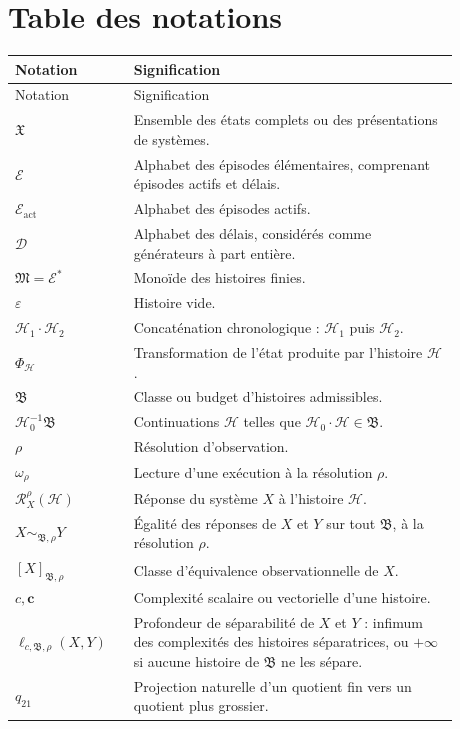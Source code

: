\section{Table des notations}
\label{annexe-histoires-notations}

\begin{center}
\begin{longtable}{p{0.23\linewidth}p{0.65\linewidth}}
\toprule
Notation & Signification \\
\midrule
\endfirsthead
\toprule
Notation & Signification \\
\midrule
\endhead
\(\mathfrak X\)
& Ensemble des états complets ou des présentations de systèmes. \\
\addlinespace
\(\mathcal E\)
& Alphabet des épisodes élémentaires, comprenant épisodes actifs et délais. \\
\addlinespace
\(\mathcal E_{\mathrm{act}}\)
& Alphabet des épisodes actifs. \\
\addlinespace
\(\mathcal D\)
& Alphabet des délais, considérés comme générateurs à part entière. \\
\addlinespace
\(\mathfrak M=\mathcal E^\ast\)
& Monoïde des histoires finies. \\
\addlinespace
\(\varepsilon\)
& Histoire vide. \\
\addlinespace
\(\mathcal H_1\cdot\mathcal H_2\)
& Concaténation chronologique : \(\mathcal H_1\) puis
  \(\mathcal H_2\). \\
\addlinespace
\(\Phi_{\mathcal H}\)
& Transformation de l'état produite par l'histoire \(\mathcal H\). \\
\addlinespace
\(\mathfrak B\)
& Classe ou budget d'histoires admissibles. \\
\addlinespace
\(\mathcal H_0^{-1}\mathfrak B\)
& Continuations \(\mathcal H\) telles que
  \(\mathcal H_0\cdot\mathcal H\in\mathfrak B\). \\
\addlinespace
\(\rho\)
& Résolution d'observation. \\
\addlinespace
\(\omega_\rho\)
& Lecture d'une exécution à la résolution \(\rho\). \\
\addlinespace
\(\mathcal R_X^\rho(\mathcal H)\)
& Réponse du système \(X\) à l'histoire \(\mathcal H\). \\
\addlinespace
\(X\sim_{\mathfrak B,\rho}Y\)
& Égalité des réponses de \(X\) et \(Y\) sur tout
  \(\mathfrak B\), à la résolution \(\rho\). \\
\addlinespace
\([X]_{\mathfrak B,\rho}\)
& Classe d'équivalence observationnelle de \(X\). \\
\addlinespace
\(c,\mathbf c\)
& Complexité scalaire ou vectorielle d'une histoire. \\
\addlinespace
\(\ell_{c,\mathfrak B,\rho}(X,Y)\)
& Profondeur de séparabilité de \(X\) et \(Y\) : infimum des complexités
  des histoires séparatrices, ou \(+\infty\) si aucune histoire de
  \(\mathfrak B\) ne les sépare. \\
\addlinespace
\(q_{21}\)
& Projection naturelle d'un quotient fin vers un quotient plus
  grossier. \\
\bottomrule
\end{longtable}
\end{center}

